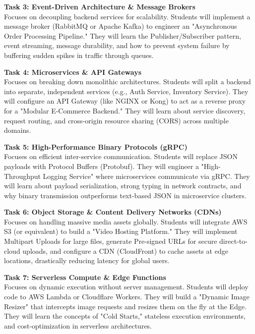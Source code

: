\noindent\textbf{Task 3: Event-Driven Architecture \& Message Brokers} \\
Focuses on decoupling backend services for scalability. Students will implement a message broker (RabbitMQ or Apache Kafka) to engineer an "Asynchronous Order Processing Pipeline." They will learn the Publisher/Subscriber pattern, event streaming, message durability, and how to prevent system failure by buffering sudden spikes in traffic through queues.

\vspace{0.3cm}

\noindent\textbf{Task 4: Microservices \& API Gateways} \\
Focuses on breaking down monolithic architectures. Students will split a backend into separate, independent services (e.g., Auth Service, Inventory Service). They will configure an API Gateway (like NGINX or Kong) to act as a reverse proxy for a "Modular E-Commerce Backend." They will learn about service discovery, request routing, and cross-origin resource sharing (CORS) across multiple domains.

\vspace{0.3cm}

\noindent\textbf{Task 5: High-Performance Binary Protocols (gRPC)} \\
Focuses on efficient inter-service communication. Students will replace JSON payloads with Protocol Buffers (Protobuf). They will engineer a "High-Throughput Logging Service" where microservices communicate via gRPC. They will learn about payload serialization, strong typing in network contracts, and why binary transmission outperforms text-based JSON in microservice clusters.

\vspace{0.3cm}

\noindent\textbf{Task 6: Object Storage \& Content Delivery Networks (CDNs)} \\
Focuses on handling massive media assets globally. Students will integrate AWS S3 (or equivalent) to build a "Video Hosting Platform." They will implement Multipart Uploads for large files, generate Pre-signed URLs for secure direct-to-cloud uploads, and configure a CDN (CloudFront) to cache assets at edge locations, drastically reducing latency for global users.

\vspace{0.3cm}

\noindent\textbf{Task 7: Serverless Compute \& Edge Functions} \\
Focuses on dynamic execution without server management. Students will deploy code to AWS Lambda or Cloudflare Workers. They will build a "Dynamic Image Resizer" that intercepts image requests and resizes them on the fly at the Edge. They will learn the concepts of "Cold Starts," stateless execution environments, and cost-optimization in serverless architectures.

